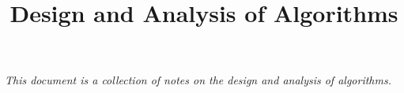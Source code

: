 \documentclass{report}
\title{\huge{Design and Analysis of Algorithms}}
\date{}
\begin{document}
\maketitle
\pagestyle{fancy}
\fancyhf{}

\begin{center}
	\emph{This document is a collection of notes on the design and analysis of algorithms.}
\end{center}

\tableofcontents
{}
\pagestyle{headings}


\pagebreak
\end{document}
